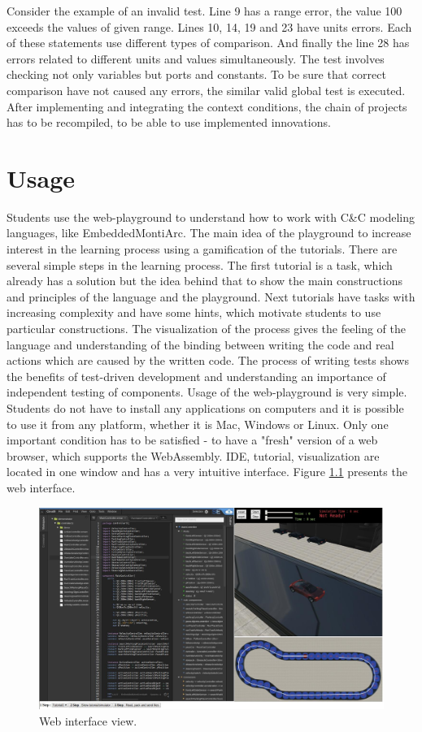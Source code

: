 \bigskip
Consider the example of an invalid test. Line 9 has a range error, the value 100 exceeds the values of given range. Lines 10, 14, 19 and 23 have units errors. Each of these statements use different types of comparison. And finally the line 28 has errors related to different units and values simultaneously. The test involves checking not only variables but ports and constants. To be sure that correct comparison have not caused any errors, the similar valid global test is executed. After implementing and integrating the context conditions, the chain of projects has to be recompiled, to be able to use implemented innovations.

\chapter{Usage} \label{sec:usage}
Students use the web-playground to understand how to work with C\&C modeling languages, like EmbeddedMontiArc. The main idea of the playground to increase interest in the learning process using a gamification of the tutorials. There are several simple steps in the learning process. The first tutorial is a task, which already has a solution but the idea behind that to show the main constructions and principles of the language and the playground. Next tutorials have tasks with increasing complexity and have some hints, which motivate students to use particular constructions. The visualization of the process gives the feeling of the language and understanding of the binding between writing the code and real actions which are caused by the written code. The process of writing tests shows the benefits of test-driven development and understanding an importance of independent testing of components. Usage of the web-playground is very simple. Students do not have to install any applications on computers and it is possible to use it from any platform, whether it is Mac, Windows or Linux. Only one important condition has to be satisfied - to have a "fresh" version of a web browser, which supports the WebAssembly. IDE, tutorial, visualization are located in one window and has a very intuitive interface. Figure \ref{fig:web-interface} presents the web interface.
\begin{figure}[h!]
    \centering
    \includegraphics[width=0.9\linewidth]{src/pic/web-interface}
    \caption{Web interface view.}
    \label{fig:web-interface}
\end{figure} \newpage
